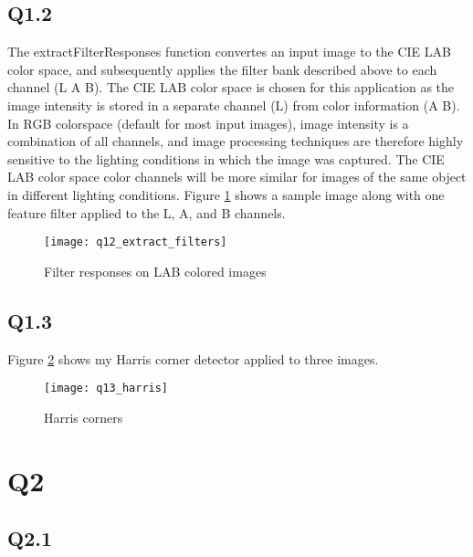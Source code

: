 \documentclass[12pt]{article}
\begin{document}
\subsection{Q1.2}
The extractFilterResponses function convertes an input image to the CIE LAB color space, and subsequently applies the filter bank described above to each channel (L A B).
The CIE LAB color space is chosen for this application as the image intensity is stored in a separate channel (L) from color information (A B). In RGB colorspace (default for most input images), image intensity is a combination of all channels, and image processing techniques are therefore highly sensitive to the lighting conditions in which the image was captured. The CIE LAB color space color channels will be more similar for images of the same object in different lighting conditions. Figure \ref{fig:extract_filter_responses} shows a sample image along with one feature filter applied to the L, A, and B channels.

\begin{figure}[H]
\centering
\texttt{[image: q12\_extract\_filters]}
\caption{Filter responses on LAB colored images}    
\label{fig:extract_filter_responses}
\end{figure}   

\newpage
\subsection{Q1.3}

Figure \ref{fig:harris_corners} shows my Harris corner detector applied to three images.

\begin{figure}[H]
\centering
\texttt{[image: q13\_harris]}
\caption{Harris corners}    
\label{fig:harris_corners}
\end{figure}   

\newpage
\section{Q2}
\subsection{Q2.1}
\end{document}
